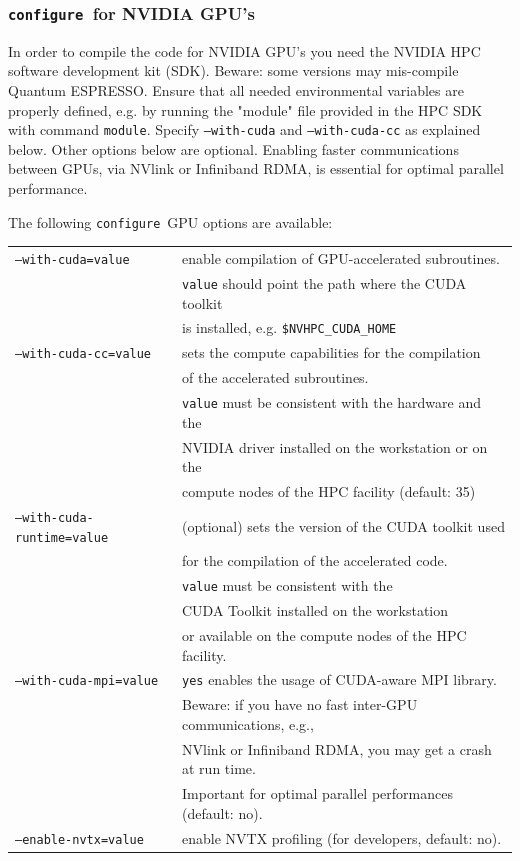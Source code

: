 \documentclass[12pt,a4paper]{article}
\def\qe{{\sc Quantum ESPRESSO}}
\def\configure{\texttt{configure}}
\begin{document}
\subsubsection{\configure\ for NVIDIA GPU's}
In order to compile the code for NVIDIA GPU's you need the NVIDIA HPC software
development kit (SDK). Beware: some versions may mis-compile \qe.
Ensure that all needed environmental variables
are properly defined, e.g. by running the "module" file provided in the HPC SDK with command
\texttt{module}. Specify \texttt{--with-cuda} and \texttt{--with-cuda-cc} as explained 
below. Other options below
are optional. Enabling faster communications between GPUs, via NVlink or Infiniband RDMA, 
is essential for optimal parallel performance. 

The following \configure\ GPU options are available:\\
\begin{tabular}{ll}
\texttt{--with-cuda=value}&         enable compilation of GPU-accelerated subroutines.\\
                          &         \texttt{value} should point the path where the CUDA toolkit \\
                          &         is installed, e.g. \texttt{\$NVHPC\_CUDA\_HOME}\\
\texttt{--with-cuda-cc=value}&      sets the compute capabilities for the compilation\\
                             &      of the accelerated subroutines. \\
                             &      \texttt{value} must be consistent with the hardware and the\\
                             &      NVIDIA driver installed on the workstation or on the\\
                             &      compute nodes of the HPC facility (default: 35)\\
\texttt{--with-cuda-runtime=value}& (optional) sets the version of the CUDA toolkit used \\
                                  & for the compilation of the accelerated code.\\
                                  & \texttt{value} must be consistent with the\\
                                  & CUDA Toolkit installed on the workstation \\
                                  & or available on the compute nodes of the HPC facility.\\
\texttt{--with-cuda-mpi=value}    & \texttt{yes} enables the usage of CUDA-aware MPI library.\\
                                  & Beware: if you have no fast inter-GPU communications, e.g.,\\
				  & NVlink or Infiniband RDMA, you may get a crash at run time.\\
				  & Important for optimal parallel performances (default: no).\\
\texttt{--enable-nvtx=value}      & enable NVTX profiling (for developers, default: no).\\
\end{tabular}
\end{document}
